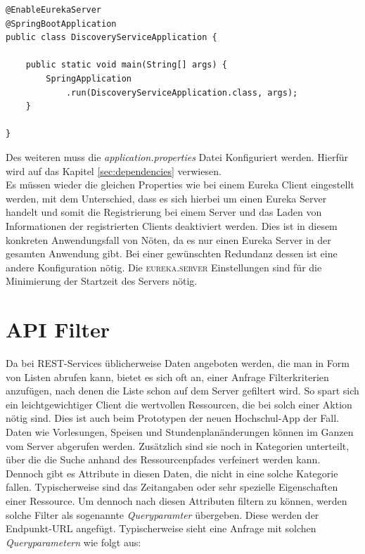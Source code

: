 \begin{lstlisting}[caption={Service als Eureka Server kennzeichnen}, label={code:eurekaapplication}] 
@EnableEurekaServer
@SpringBootApplication
public class DiscoveryServiceApplication {

    public static void main(String[] args) {
        SpringApplication
            .run(DiscoveryServiceApplication.class, args);
    }

}
\end{lstlisting}

Des weiteren muss die \textit{application.properties} Datei Konfiguriert werden. Hierfür wird auf das Kapitel \ref{sec:dependencies} verwiesen.\\
\linebreak
Es müssen wieder die gleichen Properties wie bei einem Eureka Client eingestellt werden, mit dem Unterschied, dass es sich hierbei um einen Eureka Server handelt und somit die Registrierung bei einem Server und das Laden von Informationen der registrierten Clients deaktiviert werden. Dies ist in diesem konkreten Anwendungsfall von Nöten, da es nur einen Eureka Server in der gesamten Anwendung gibt. Bei einer gewünschten Redundanz dessen ist eine andere Konfiguration nötig. Die \textsc{eureka.server} Einstellungen sind für die Minimierung der Startzeit des Servers nötig.

\section{API Filter}

Da bei \ac{REST}-Services üblicherweise Daten angeboten werden, die man in Form von Listen abrufen kann, bietet es sich oft an, einer Anfrage Filterkriterien anzufügen, nach denen die Liste schon auf dem Server gefiltert wird. So spart sich ein leichtgewichtiger Client die wertvollen Ressourcen, die bei solch einer Aktion nötig sind. Dies ist auch beim Prototypen der neuen Hochschul-\ac{App} der Fall. Daten wie Vorlesungen, Speisen und Stundenplanänderungen können im Ganzen vom Server abgerufen werden. Zusätzlich sind sie noch in Kategorien unterteilt, über die die Suche anhand des Ressourcenpfades verfeinert werden kann. Dennoch gibt es Attribute in diesen Daten, die nicht in eine solche Kategorie fallen. Typischerweise sind das Zeitangaben oder sehr spezielle Eigenschaften einer Ressource. Um dennoch nach diesen Attributen filtern zu können, werden solche Filter als sogenannte \textit{Queryparamter} übergeben. Diese werden der Endpunkt-\ac{URL} angefügt. Typischerweise sieht eine Anfrage mit solchen \textit{Queryparametern} wie folgt aus:

